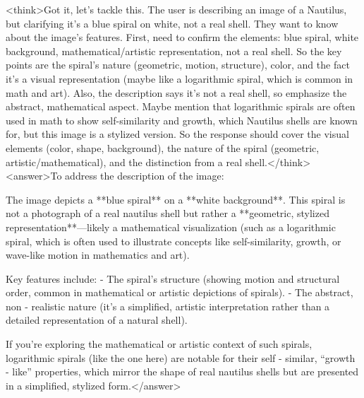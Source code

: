 <think>Got it, let's tackle this. The user is describing an image of a Nautilus, but clarifying it's a blue spiral on white, not a real shell. They want to know about the image's features. First, need to confirm the elements: blue spiral, white background, mathematical/artistic representation, not a real shell. So the key points are the spiral's nature (geometric, motion, structure), color, and the fact it's a visual representation (maybe like a logarithmic spiral, which is common in math and art). Also, the description says it's not a real shell, so emphasize the abstract, mathematical aspect. Maybe mention that logarithmic spirals are often used in math to show self-similarity and growth, which Nautilus shells are known for, but this image is a stylized version. So the response should cover the visual elements (color, shape, background), the nature of the spiral (geometric, artistic/mathematical), and the distinction from a real shell.</think><answer>To address the description of the image:  

The image depicts a **blue spiral** on a **white background**. This spiral is not a photograph of a real nautilus shell but rather a **geometric, stylized representation**—likely a mathematical visualization (such as a logarithmic spiral, which is often used to illustrate concepts like self-similarity, growth, or wave-like motion in mathematics and art).  

Key features include:  
- The spiral’s structure (showing motion and structural order, common in mathematical or artistic depictions of spirals).  
- The abstract, non - realistic nature (it’s a simplified, artistic interpretation rather than a detailed representation of a natural shell).  

If you’re exploring the mathematical or artistic context of such spirals, logarithmic spirals (like the one here) are notable for their self - similar, “growth - like” properties, which mirror the shape of real nautilus shells but are presented in a simplified, stylized form.</answer>